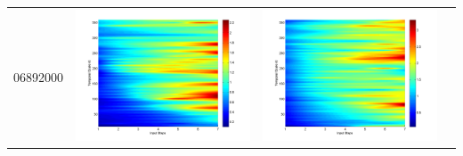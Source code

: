 \documentclass[11pt]{article}
\begin{document}
\begin{table}[H]
{\begin{tabular}{c  c   c   c  }
06892000&\begin{minipage}{.3\textwidth}\includegraphics[width=\linewidth]{resultgraph/06892000p.png}\end{minipage}
&\begin{minipage}{.3\textwidth}\includegraphics[width=\linewidth]{resultgraph/06892000pep.png}\end{minipage}

\end{tabular}}
\end{table}
\end{document}
